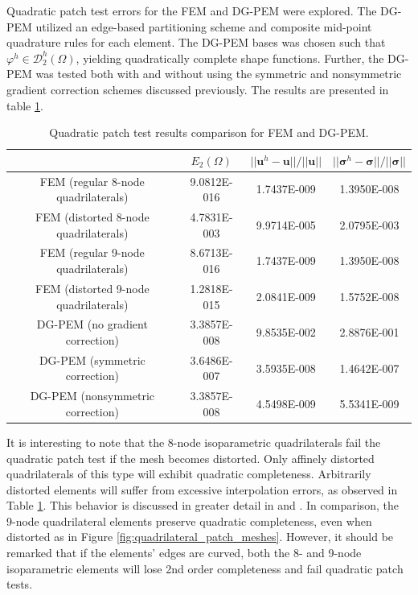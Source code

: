 Quadratic patch test errors for the FEM and DG-PEM were explored. The DG-PEM utilized an edge-based partitioning scheme and composite mid-point quadrature rules for each element. The DG-PEM bases was chosen such that $\varphi^h \in \mathcal{D}^h_2 (\Omega)$, yielding quadratically complete shape functions. Further, the DG-PEM was tested both with and without using the symmetric and nonsymmetric gradient correction schemes discussed previously. The results are presented in table \ref{tab:quadratic_patch_test}.

\begin{table}[!ht]
  \begin{center}
    \begin{tabular}{| c || c | c | c |}
    \hline
           & $E_2 (\Omega)$ & $||\mathbf{u}^h - \mathbf{u}|| / ||\mathbf{u}||$ & $||\boldsymbol{\sigma}^h - \boldsymbol{\sigma}|| / ||\boldsymbol{\sigma}||$ \\ \hline \hline
    FEM (regular 8-node quadrilaterals) & 9.0812E-016 & 1.7437E-009 & 1.3950E-008 \\ \hline
    FEM (distorted 8-node quadrilaterals) & 4.7831E-003 & 9.9714E-005 & 2.0795E-003 \\ \hline
    FEM (regular 9-node quadrilaterals) & 8.6713E-016 & 1.7437E-009 & 1.3950E-008 \\ \hline
    FEM (distorted 9-node quadrilaterals) & 1.2818E-015 & 2.0841E-009 & 1.5752E-008 \\ \hline
    DG-PEM (no gradient correction) & 3.3857E-008 & 9.8535E-002 & 2.8876E-001 \\ \hline
    DG-PEM (symmetric correction) & 3.6486E-007 & 3.5935E-008 & 1.4642E-007 \\ \hline
    DG-PEM (nonsymmetric correction) & 3.3857E-008 & 4.5498E-009 & 5.5341E-009 \\
    \hline
    \end{tabular}
    \caption{Quadratic patch test results comparison for FEM and DG-PEM.}
    \vspace{-5pt}
    \label{tab:quadratic_patch_test}
    \vspace{-25pt}
  \end{center}
\end{table}

It is interesting to note that the 8-node isoparametric quadrilaterals fail the quadratic patch test if the mesh becomes distorted. Only affinely distorted quadrilaterals of this type will exhibit quadratic completeness. Arbitrarily distorted elements will suffer from excessive interpolation errors, as observed in Table \ref{tab:quadratic_patch_test}. This behavior is discussed in greater detail in \cite{Arnold:02} and \cite{Arnold:01}. In comparison, the 9-node quadrilateral elements preserve quadratic completeness, even when distorted as in Figure \ref{fig:quadrilateral_patch_meshes}. However, it should be remarked that if the elements' edges are curved, both the 8- and 9-node isoparametric elements will lose 2nd order completeness and fail quadratic patch tests.

